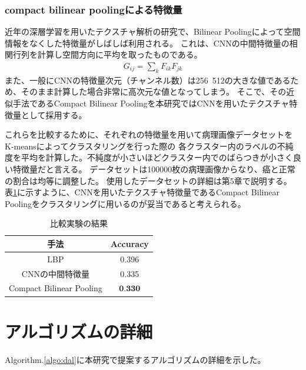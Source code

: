\subsubsection{compact bilinear poolingによる特徴量}
近年の深層学習を用いたテクスチャ解析の研究で、Bilinear Poolingによって空間情報をなくした特徴量がしばしば利用される。
これは、CNNの中間特徴量の相関行列を計算し空間方向に平均を取ったものである。
\begin{eqnarray}
G_{ij} = \sum_k{F_{ik} F_{jk}}
\end{eqnarray}
また、一般にCNNの特徴量次元（チャンネル数）は256~512の大きな値であるため、そのまま計算した場合非常に高次元な値となってしまう。
そこで、その近似手法であるCompact Bilinear Pooling\cite{gao2016compact}を本研究ではCNNを用いたテクスチャ特徴量として採用する。

これらを比較するために、それぞれの特徴量を用いて病理画像データセットをK-meansによってクラスタリングを行った際の
各クラスター内のラベルの不純度を平均を計算した。不純度が小さいほどクラスター内でのばらつきが小さく良い特徴量だと言える。
データセットは100000枚の病理画像からなり、癌と正常の割合は均等に調整した。
使用したデータセットの詳細は第5章で説明する。
表\ref{table:compare_feat}に示すように、CNNを用いたテクスチャ特徴量であるCompact Bilinear Poolingをクラスタリングに用いるのが妥当であると考えられる。

\begin{table}[h]
  \label{table:compare_feat}
  \caption{比較実験の結果}
  \center
  \begin{tabular}{c|c} \hline
     手法 & Accuracy \\ \hline
    LBP & 0.396 \\
    CNNの中間特徴量 & 0.335  \\ 
    Compact Bilinear Pooling & $\textbf{0.330}$ \\ \hline
  \end{tabular}
\end{table}

\section{アルゴリズムの詳細}

Algorithm.\ref{algo:dal}に本研究で提案するアルゴリズムの詳細を示した。


